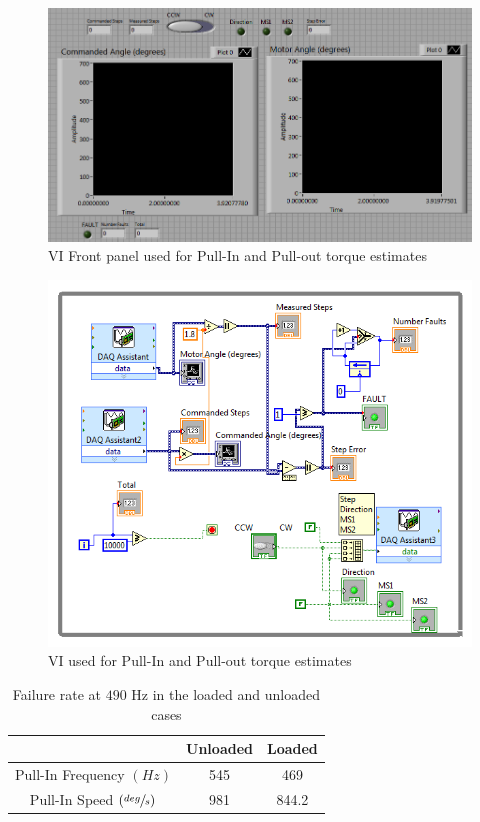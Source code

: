\documentclass{article}
\theoremstyle{plain}
\theoremstyle{definition}
\theoremstyle{remark}
\begin{document}
\begin{figure}
\begin{center}
\includegraphics[width = 13cm]{ExternalSourceFront.png}
\caption{VI Front panel used for Pull-In and Pull-out torque estimates}
\label{q3b_Front}
\end{center}
\end{figure}

\begin{figure}
\begin{center}
\includegraphics[width = 13cm]{ExternalSourceBack.png}
\caption{VI used for Pull-In and Pull-out torque estimates}
\label{q3b_Back}
\end{center}
\end{figure}

\begin{table}
\begin{center}
    \begin{tabular}{|c|c|c|}
        \hline
        ~                    & Unloaded & Loaded \\ \hline
        Pull-In Frequency $(Hz)$ & 545        & 469      \\
	Pull-In Speed $(\sfrac{deg}{s})$ & 981 & 844.2 \\
        \hline
    \end{tabular}
\caption{Failure rate at $490$ Hz in the loaded and unloaded cases}
\label{q3b_table1}
\end{center}
\end{table}
\end{document}
